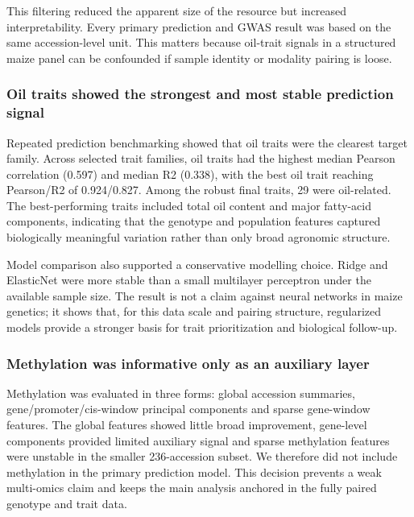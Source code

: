 \documentclass[
]{article}
\begin{document}
This filtering reduced the apparent size of the resource but increased
interpretability. Every primary prediction and GWAS result was based on
the same accession-level unit. This matters because oil-trait signals in
a structured maize panel can be confounded if sample identity or
modality pairing is loose.

\subsubsection{Oil traits showed the strongest and most stable
prediction
signal}\label{oil-traits-showed-the-strongest-and-most-stable-prediction-signal}

Repeated prediction benchmarking showed that oil traits were the
clearest target family. Across selected trait families, oil traits had
the highest median Pearson correlation (0.597) and median R2 (0.338),
with the best oil trait reaching Pearson/R2 of 0.924/0.827. Among the
robust final traits, 29 were oil-related. The best-performing traits
included total oil content and major fatty-acid components, indicating
that the genotype and population features captured biologically
meaningful variation rather than only broad agronomic structure.

Model comparison also supported a conservative modelling choice. Ridge
and ElasticNet were more stable than a small multilayer perceptron under
the available sample size. The result is not a claim against neural
networks in maize genetics; it shows that, for this data scale and
pairing structure, regularized models provide a stronger basis for trait
prioritization and biological follow-up.

\subsubsection{Methylation was informative only as an auxiliary
layer}\label{methylation-was-informative-only-as-an-auxiliary-layer}

Methylation was evaluated in three forms: global accession summaries,
gene/promoter/cis-window principal components and sparse gene-window
features. The global features showed little broad improvement,
gene-level components provided limited auxiliary signal and sparse
methylation features were unstable in the smaller 236-accession subset.
We therefore did not include methylation in the primary prediction
model. This decision prevents a weak multi-omics claim and keeps the
main analysis anchored in the fully paired genotype and trait data.
\end{document}
